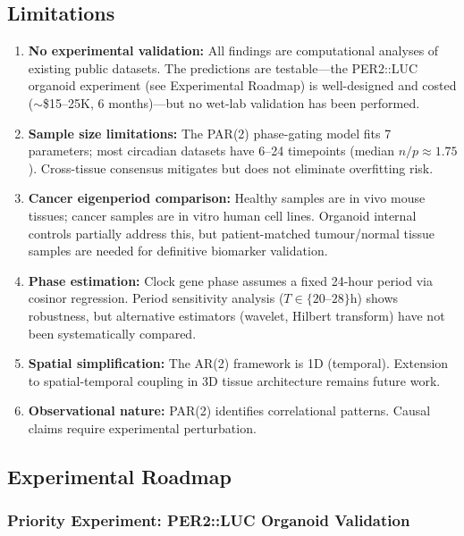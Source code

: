 \documentclass[11pt,letterpaper]{article}
\begin{document}
\subsection{Limitations}

\begin{enumerate}
\item \textbf{No experimental validation:} All findings are computational analyses of existing public datasets. The predictions are testable---the PER2::LUC organoid experiment (see Experimental Roadmap) is well-designed and costed ($\sim$\$15--25K, 6 months)---but no wet-lab validation has been performed.
\item \textbf{Sample size limitations:} The PAR(2) phase-gating model fits 7 parameters; most circadian datasets have 6--24 timepoints (median $n/p \approx 1.75$). Cross-tissue consensus mitigates but does not eliminate overfitting risk.
\item \textbf{Cancer eigenperiod comparison:} Healthy samples are in vivo mouse tissues; cancer samples are in vitro human cell lines. Organoid internal controls partially address this, but patient-matched tumour/normal tissue samples are needed for definitive biomarker validation.
\item \textbf{Phase estimation:} Clock gene phase assumes a fixed 24-hour period via cosinor regression. Period sensitivity analysis ($T \in \{20$--$28\}$h) shows robustness, but alternative estimators (wavelet, Hilbert transform) have not been systematically compared.
\item \textbf{Spatial simplification:} The AR(2) framework is 1D (temporal). Extension to spatial-temporal coupling in 3D tissue architecture remains future work.
\item \textbf{Observational nature:} PAR(2) identifies correlational patterns. Causal claims require experimental perturbation.
\end{enumerate}

\subsection{Experimental Roadmap}

\subsubsection{Priority Experiment: PER2::LUC Organoid Validation}
\end{document}

